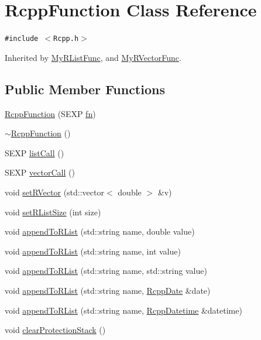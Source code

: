 \hypertarget{classRcppFunction}{
\section{RcppFunction Class Reference}
\label{classRcppFunction}
}
{\tt \#include $<$Rcpp.h$>$}

Inherited by \hyperlink{classMyRListFunc}{MyRListFunc}, and \hyperlink{classMyRVectorFunc}{MyRVectorFunc}.

\subsection*{Public Member Functions}
\begin{CompactItemize}
\item 
\hyperlink{classRcppFunction_6fc6fca8d052170d86240c784f54261a}{RcppFunction} (SEXP \hyperlink{classRcppFunction_a6b5966224b8b7d158be6cdfc3612063}{fn})
\item 
\hyperlink{classRcppFunction_e155cf5dd33cb110e9a89a59c7bff6e9}{$\sim$RcppFunction} ()
\item 
SEXP \hyperlink{classRcppFunction_0cc9d29ab7db552494dddefaa78e6578}{listCall} ()
\item 
SEXP \hyperlink{classRcppFunction_c57c514c761609892ff553434e134446}{vectorCall} ()
\item 
void \hyperlink{classRcppFunction_482df5aa5e2a98d52c9a79cf3ab31c67}{setRVector} (std::vector$<$ double $>$ \&v)
\item 
void \hyperlink{classRcppFunction_f3dbcf8dcfbdfc49ef566b5efd0ad978}{setRListSize} (int size)
\item 
void \hyperlink{classRcppFunction_0df1a8ff093e21a2a7c6fc80d6645c7e}{appendToRList} (std::string name, double value)
\item 
void \hyperlink{classRcppFunction_fce449ac5d89b32e0e0b9f584278a672}{appendToRList} (std::string name, int value)
\item 
void \hyperlink{classRcppFunction_861ba7ae5c09acf31a034472b5a47728}{appendToRList} (std::string name, std::string value)
\item 
void \hyperlink{classRcppFunction_9aab0b3accb81d90fb813acf3bf4c49d}{appendToRList} (std::string name, \hyperlink{classRcppDate}{RcppDate} \&date)
\item 
void \hyperlink{classRcppFunction_0be4ab064287c2d3a5c3b883a1707d70}{appendToRList} (std::string name, \hyperlink{classRcppDatetime}{RcppDatetime} \&datetime)
\item 
void \hyperlink{classRcppFunction_689c914636f0f0e86b90da4425c6e6a3}{clearProtectionStack} ()
\end{CompactItemize}

